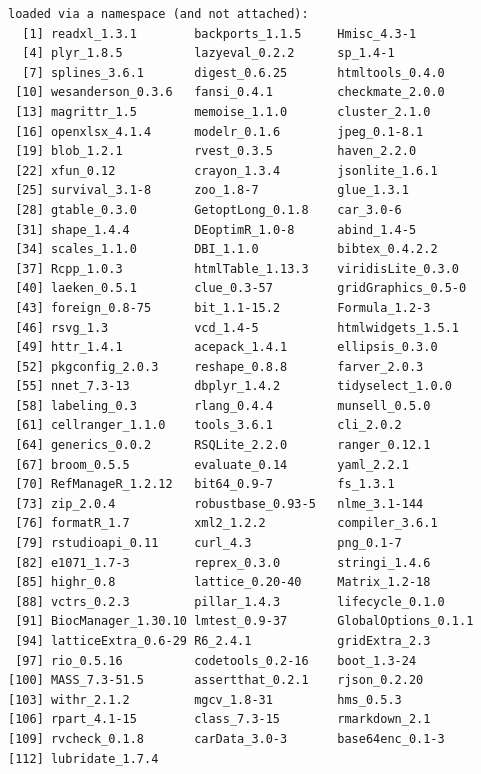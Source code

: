 \documentclass[11pt,]{article}
\begin{document}
\begin{verbatim}
loaded via a namespace (and not attached):
  [1] readxl_1.3.1        backports_1.1.5     Hmisc_4.3-1        
  [4] plyr_1.8.5          lazyeval_0.2.2      sp_1.4-1           
  [7] splines_3.6.1       digest_0.6.25       htmltools_0.4.0    
 [10] wesanderson_0.3.6   fansi_0.4.1         checkmate_2.0.0    
 [13] magrittr_1.5        memoise_1.1.0       cluster_2.1.0      
 [16] openxlsx_4.1.4      modelr_0.1.6        jpeg_0.1-8.1       
 [19] blob_1.2.1          rvest_0.3.5         haven_2.2.0        
 [22] xfun_0.12           crayon_1.3.4        jsonlite_1.6.1     
 [25] survival_3.1-8      zoo_1.8-7           glue_1.3.1         
 [28] gtable_0.3.0        GetoptLong_0.1.8    car_3.0-6          
 [31] shape_1.4.4         DEoptimR_1.0-8      abind_1.4-5        
 [34] scales_1.1.0        DBI_1.1.0           bibtex_0.4.2.2     
 [37] Rcpp_1.0.3          htmlTable_1.13.3    viridisLite_0.3.0  
 [40] laeken_0.5.1        clue_0.3-57         gridGraphics_0.5-0 
 [43] foreign_0.8-75      bit_1.1-15.2        Formula_1.2-3      
 [46] rsvg_1.3            vcd_1.4-5           htmlwidgets_1.5.1  
 [49] httr_1.4.1          acepack_1.4.1       ellipsis_0.3.0     
 [52] pkgconfig_2.0.3     reshape_0.8.8       farver_2.0.3       
 [55] nnet_7.3-13         dbplyr_1.4.2        tidyselect_1.0.0   
 [58] labeling_0.3        rlang_0.4.4         munsell_0.5.0      
 [61] cellranger_1.1.0    tools_3.6.1         cli_2.0.2          
 [64] generics_0.0.2      RSQLite_2.2.0       ranger_0.12.1      
 [67] broom_0.5.5         evaluate_0.14       yaml_2.2.1         
 [70] RefManageR_1.2.12   bit64_0.9-7         fs_1.3.1           
 [73] zip_2.0.4           robustbase_0.93-5   nlme_3.1-144       
 [76] formatR_1.7         xml2_1.2.2          compiler_3.6.1     
 [79] rstudioapi_0.11     curl_4.3            png_0.1-7          
 [82] e1071_1.7-3         reprex_0.3.0        stringi_1.4.6      
 [85] highr_0.8           lattice_0.20-40     Matrix_1.2-18      
 [88] vctrs_0.2.3         pillar_1.4.3        lifecycle_0.1.0    
 [91] BiocManager_1.30.10 lmtest_0.9-37       GlobalOptions_0.1.1
 [94] latticeExtra_0.6-29 R6_2.4.1            gridExtra_2.3      
 [97] rio_0.5.16          codetools_0.2-16    boot_1.3-24        
[100] MASS_7.3-51.5       assertthat_0.2.1    rjson_0.2.20       
[103] withr_2.1.2         mgcv_1.8-31         hms_0.5.3          
[106] rpart_4.1-15        class_7.3-15        rmarkdown_2.1      
[109] rvcheck_0.1.8       carData_3.0-3       base64enc_0.1-3    
[112] lubridate_1.7.4    
\end{verbatim}
\end{document}
